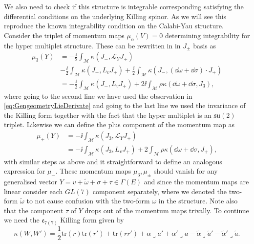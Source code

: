 We also need to check if this structure is integrable corresponding satisfying the differential conditions on the underlying Killing spinor. As we will see this reproduce the known integrability condition on the Calabi-Yau structure. Consider the triplet of momentum maps $\mu_\alpha(V)=0$ determining integrability for the hyper multiplet structure. These can be rewritten in in $J_\pm$ basis as 
\begin{equation}
    \begin{aligned}
    \mu_3(Y)&= -\frac{\ii}{2}\int_\mathcal{M} \kappa(J_-,\mathscr{L}_YJ_+)\\
            & -\frac{\ii}{2}\int_\mathcal{M}\kappa(J_-,L_vJ_+)+\frac{\ii}{2}\int_\mathcal{M}\kappa(J_-,(\dd\omega+\dd\sigma)\cdot J_+)\\
            &= -\frac{\ii}{2}\int_\mathcal{M}\kappa(J_-,L_vJ_+)+2\ii  \int_\mathcal{M}\rho\kappa(\dd\omega+\dd\sigma,J_3),
    \end{aligned}
\end{equation}
where going to the second line we have used the observation in \eqref{eq:GengeometryLieDerivate} and going to the last line we used the invariance of the Killing form together with the fact that the hyper multiplet is an $\mathfrak{su}(2)$ triplet. Likewise we can define the plus component of the momentum map as 
\begin{equation}
    \begin{aligned}
    \mu_+(Y) &= -\ii\int_\mathcal{M}\kappa(J_3,\mathscr{L}_YJ_+)\\
          &= -\ii\int_\mathcal{M}\kappa(J_3,L_vJ_+)+2\int_\mathcal{M}\rho\kappa(\dd\omega+\dd\sigma,J_+),
    \end{aligned}
\end{equation}
with similar steps as above and it straightforward to define an analogous expression for $\mu_-$. These momentum maps $\mu_3,\mu_{\pm}$ should vanish for any generalised vector $Y=v+\tilde{\omega}+\sigma+\tau\in\Gamma(E)$ and since the momentum maps are linear consider each $GL(7)$ component separately, where we denoted the two-form $\tilde{\omega}$ to not cause confusion with the two-form $\omega$ in the structure. Note also that the component $\tau$ of $Y$ drops out of the momentum maps trivally. To continue we need the $\mathfrak{e}_{7(7)}$ Killing form given by 
\begin{equation}
    \kappa(W,W') = \frac{1}{2}\text{tr}(r)\text{tr}(r')+\text{tr}(rr')+\alpha \lrcorner a'+\alpha'\lrcorner a-\tilde{\alpha}\lrcorner \tilde{a}'-\tilde{\alpha}'\lrcorner \tilde{a}.
\end{equation}

